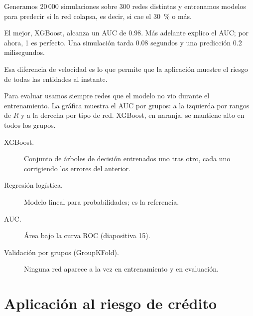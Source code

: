 \begin{decir}
Generamos 20\,000 simulaciones sobre 300 redes distintas y entrenamos modelos para
predecir si la red colapsa, es decir, si cae el 30~\% o más.

El mejor, XGBoost, alcanza un AUC de 0.98. Más adelante explico el AUC; por ahora, 1 es
perfecto. Una simulación tarda 0.08 segundos y una predicción 0.2 milisegundos.

Esa diferencia de velocidad
es lo que permite que la aplicación muestre el riesgo de todas las entidades al instante.

Para evaluar usamos siempre redes que el modelo no vio durante el entrenamiento. La
gráfica muestra el AUC por grupos: a la izquierda por rangos de $R$ y a la derecha por
tipo de red. XGBoost, en naranja, se mantiene alto en todos los grupos.
\end{decir}
\begin{terminos}
\begin{description}
\item[XGBoost.] Conjunto de árboles de decisión entrenados uno tras otro, cada uno
corrigiendo los errores del anterior.
\item[Regresión logística.] Modelo lineal para probabilidades; es la referencia.
\item[AUC.] Área bajo la curva ROC (diapositiva 15).
\item[Validación por grupos (GroupKFold).] Ninguna red aparece a la vez en entrenamiento
y en evaluación.
\end{description}
\end{terminos}
\begin{preguntas}
\end{preguntas}

\section{Aplicación al riesgo de crédito}


